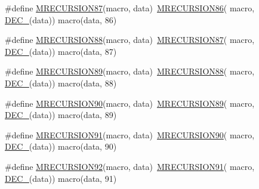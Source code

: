 \begin{DoxyCompactItemize}
\item 
\#define \mbox{\hyperlink{group__group__sam0__utils__mrecursion_gac2d7de404d632efc644ba343ae3bdafc}{M\+R\+E\+C\+U\+R\+S\+I\+O\+N87}}(macro,  data)~\mbox{\hyperlink{group__group__sam0__utils__mrecursion_gac51f17bf8f61be0fe68a40cdaca97002}{M\+R\+E\+C\+U\+R\+S\+I\+O\+N86}}(  macro, \mbox{\hyperlink{group__group__sam0__utils__mrecursion_ga1d23d683797679dca8c3512a54a5dcae}{D\+E\+C\+\_\+}}(data))   macro(data, 86)
\item 
\#define \mbox{\hyperlink{group__group__sam0__utils__mrecursion_ga7a218f615f598fbbc92149ac191c3003}{M\+R\+E\+C\+U\+R\+S\+I\+O\+N88}}(macro,  data)~\mbox{\hyperlink{group__group__sam0__utils__mrecursion_gac2d7de404d632efc644ba343ae3bdafc}{M\+R\+E\+C\+U\+R\+S\+I\+O\+N87}}(  macro, \mbox{\hyperlink{group__group__sam0__utils__mrecursion_ga1d23d683797679dca8c3512a54a5dcae}{D\+E\+C\+\_\+}}(data))   macro(data, 87)
\item 
\#define \mbox{\hyperlink{group__group__sam0__utils__mrecursion_ga4aaba445e78b860dbe24197f48bab4b2}{M\+R\+E\+C\+U\+R\+S\+I\+O\+N89}}(macro,  data)~\mbox{\hyperlink{group__group__sam0__utils__mrecursion_ga7a218f615f598fbbc92149ac191c3003}{M\+R\+E\+C\+U\+R\+S\+I\+O\+N88}}(  macro, \mbox{\hyperlink{group__group__sam0__utils__mrecursion_ga1d23d683797679dca8c3512a54a5dcae}{D\+E\+C\+\_\+}}(data))   macro(data, 88)
\item 
\#define \mbox{\hyperlink{group__group__sam0__utils__mrecursion_gaaf8d19004bc883b73606eec23ce0e29a}{M\+R\+E\+C\+U\+R\+S\+I\+O\+N90}}(macro,  data)~\mbox{\hyperlink{group__group__sam0__utils__mrecursion_ga4aaba445e78b860dbe24197f48bab4b2}{M\+R\+E\+C\+U\+R\+S\+I\+O\+N89}}(  macro, \mbox{\hyperlink{group__group__sam0__utils__mrecursion_ga1d23d683797679dca8c3512a54a5dcae}{D\+E\+C\+\_\+}}(data))   macro(data, 89)
\item 
\#define \mbox{\hyperlink{group__group__sam0__utils__mrecursion_ga07bd82d35c4d64112e70c61028ce1580}{M\+R\+E\+C\+U\+R\+S\+I\+O\+N91}}(macro,  data)~\mbox{\hyperlink{group__group__sam0__utils__mrecursion_gaaf8d19004bc883b73606eec23ce0e29a}{M\+R\+E\+C\+U\+R\+S\+I\+O\+N90}}(  macro, \mbox{\hyperlink{group__group__sam0__utils__mrecursion_ga1d23d683797679dca8c3512a54a5dcae}{D\+E\+C\+\_\+}}(data))   macro(data, 90)
\item 
\#define \mbox{\hyperlink{group__group__sam0__utils__mrecursion_gab27a1381cfcad4d4398dbd87166b9189}{M\+R\+E\+C\+U\+R\+S\+I\+O\+N92}}(macro,  data)~\mbox{\hyperlink{group__group__sam0__utils__mrecursion_ga07bd82d35c4d64112e70c61028ce1580}{M\+R\+E\+C\+U\+R\+S\+I\+O\+N91}}(  macro, \mbox{\hyperlink{group__group__sam0__utils__mrecursion_ga1d23d683797679dca8c3512a54a5dcae}{D\+E\+C\+\_\+}}(data))   macro(data, 91)

\end{DoxyCompactItemize}
